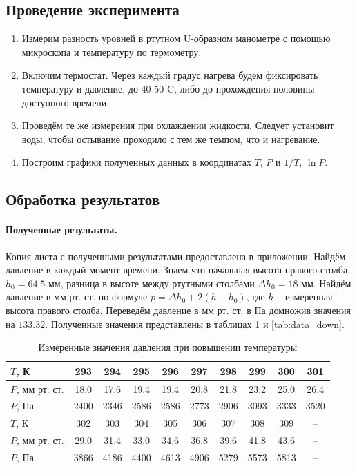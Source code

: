 \documentclass[a4paper,12pt]{article} %
\begin{document}
\subsection{Проведение эксперимента}

\begin{enumerate}
\itemsep0em

\item
Измерим разность уровней в ртутном U-образном манометре с помощью микроскопа и температуру по термометру.
\item
Включим термостат. Через каждый градус нагрева будем фиксировать температуру и давление, до 40-50 \degree C, либо до прохождения половины доступного времени.
\item
Проведём те же измерения при охлаждении жидкости. Следует установит воды, чтобы остывание проходило с тем же темпом, что и нагревание.
\item
Построим графики полученных данных в координатах $T$, $P$ и $1/T$, $\ln{P}$. 

\end{enumerate}

\subsection{Обработка результатов}

\paragraph{Полученные результаты.}
Копия листа с полученными результатами предоставлена в приложении. Найдём давление в каждый момент времени. Знаем что начальная высота правого столба $h_0 = 64.5$ мм, разница в высоте между ртутными столбами $ \Delta h_0 = 18 $ мм. Найдём давление в мм рт. ст. по формуле $ p = \Delta h_0 + 2(h - h_0) $, где $h$ -- измеренная высота правого столба. Переведём давление в мм рт. ст. в Па домножив значения на $133.32$. Полученные значения представлены в таблицах \ref{tab:data_up} и \ref{tab:data_down}.


\begin{table}[h]
\begin{center}
\begin{tabular}{|l|c|c|c|c|c|c|c|c|c|}
\hline 
$T$, К & 293 & 294 & 295 & 296 & 297 & 298 & 299 & 300 & 301 \\ 
\hline 
$P$, мм рт. ст. & 18.0 & 17.6 & 19.4 & 19.4 & 20.8 & 21.8 & 23.2 & 25.0 & 26.4 \\ 
\hline
$P$, Па & 2400 & 2346 & 2586 & 2586 & 2773 & 2906 & 3093 & 3333 & 3520 \\
\hline 
\hline
$T$, К & 302 & 303 & 304 & 305 & 306 & 307 & 308 & 309 & -- \\ 
\hline 
$P$, мм рт. ст. & 29.0 & 31.4 & 33.0 & 34.6 & 36.8 & 39.6 & 41.8 & 43.6 & -- \\ 
\hline
$P$, Па &  3866 & 4186 & 4400 & 4613 & 4906 & 5279 & 5573 & 5813 & -- \\
\hline 
\end{tabular} 
\end{center}
\caption{Измеренные значения давления при повышении температуры}
\label{tab:data_up}
\end{table}
	
\end{document}
